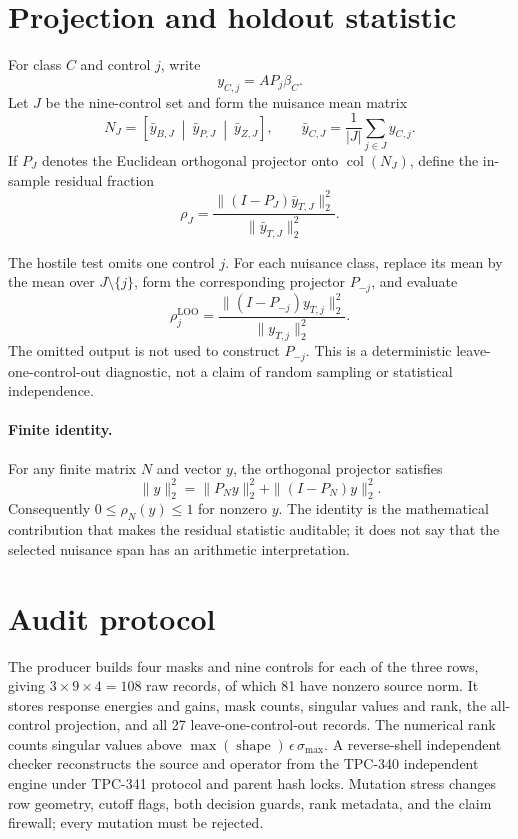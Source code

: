 \documentclass[10pt]{article}
\begin{document}
\section{Projection and holdout statistic}

For class $C$ and control $j$, write
\[
 y_{C,j}=A P_j\beta_C.
\]
Let $J$ be the nine-control set and form the nuisance mean matrix
\[
 N_J=\left[\bar y_{B,J}\ \middle|\ \bar y_{P,J}\ \middle|\ \bar y_{Z,J}\right],
 \qquad
 \bar y_{C,J}=\frac1{|J|}\sum_{j\in J}y_{C,j}.
\]
If $P_J$ denotes the Euclidean orthogonal projector onto
$\operatorname{col}(N_J)$, define the in-sample residual fraction
\begin{equation}
 \rho_J=\frac{\|(I-P_J)\bar y_{T,J}\|_2^2}
                 {\|\bar y_{T,J}\|_2^2}.
 \label{eq:insample}
\end{equation}

The hostile test omits one control $j$.  For each nuisance class, replace its
mean by the mean over $J\setminus\{j\}$, form the corresponding projector
$P_{-j}$, and evaluate
\begin{equation}
 \rho^{\mathrm{LOO}}_j=
 \frac{\|(I-P_{-j})y_{T,j}\|_2^2}{\|y_{T,j}\|_2^2}.
 \label{eq:loo}
\end{equation}
The omitted output is not used to construct $P_{-j}$.  This is a deterministic
leave-one-control-out diagnostic, not a claim of random sampling or
statistical independence.

\paragraph{Finite identity.}
For any finite matrix $N$ and vector $y$, the orthogonal projector satisfies
\begin{equation}
 \|y\|_2^2=\|P_Ny\|_2^2+\|(I-P_N)y\|_2^2.
 \label{eq:pythagorean}
\end{equation}
Consequently $0\leq\rho_N(y)\leq1$ for nonzero $y$.  The identity is the
mathematical contribution that makes the residual statistic auditable; it does
not say that the selected nuisance span has an arithmetic interpretation.

\section{Audit protocol}

The producer builds four masks and nine controls for each of the three rows,
giving $3\times9\times4=108$ raw records, of which 81 have nonzero source
norm.  It stores response energies and gains, mask counts, singular values and
rank, the all-control projection, and all 27 leave-one-control-out records.
The numerical rank counts singular values above
$\max(\operatorname{shape})\,\epsilon\,\sigma_{\max}$.  A reverse-shell
independent checker reconstructs the source and operator from the TPC-340
independent engine under TPC-341 protocol and parent hash locks.  Mutation stress changes row
geometry, cutoff flags, both decision guards, rank metadata, and the claim
firewall; every mutation must be rejected.
\end{document}
